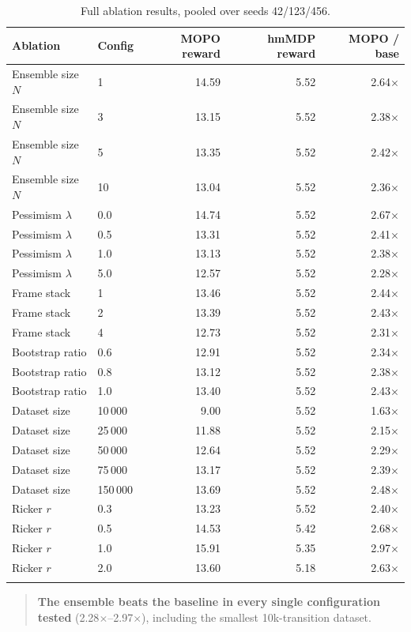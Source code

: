 \documentclass[11pt]{article}
\begin{document}
\begin{longtable}{llrrr}
\toprule
Ablation & Config & MOPO reward & hmMDP reward & MOPO / base \\
\midrule
\endhead
Ensemble size $N$ & 1   & 14.59 & 5.52 & 2.64$\times$ \\
Ensemble size $N$ & 3   & 13.15 & 5.52 & 2.38$\times$ \\
Ensemble size $N$ & 5   & 13.35 & 5.52 & 2.42$\times$ \\
Ensemble size $N$ & 10  & 13.04 & 5.52 & 2.36$\times$ \\
Pessimism $\lambda$ & 0.0 & 14.74 & 5.52 & 2.67$\times$ \\
Pessimism $\lambda$ & 0.5 & 13.31 & 5.52 & 2.41$\times$ \\
Pessimism $\lambda$ & 1.0 & 13.13 & 5.52 & 2.38$\times$ \\
Pessimism $\lambda$ & 5.0 & 12.57 & 5.52 & 2.28$\times$ \\
Frame stack & 1 & 13.46 & 5.52 & 2.44$\times$ \\
Frame stack & 2 & 13.39 & 5.52 & 2.43$\times$ \\
Frame stack & 4 & 12.73 & 5.52 & 2.31$\times$ \\
Bootstrap ratio & 0.6 & 12.91 & 5.52 & 2.34$\times$ \\
Bootstrap ratio & 0.8 & 13.12 & 5.52 & 2.38$\times$ \\
Bootstrap ratio & 1.0 & 13.40 & 5.52 & 2.43$\times$ \\
Dataset size & 10\,000  & 9.00  & 5.52 & 1.63$\times$ \\
Dataset size & 25\,000  & 11.88 & 5.52 & 2.15$\times$ \\
Dataset size & 50\,000  & 12.64 & 5.52 & 2.29$\times$ \\
Dataset size & 75\,000  & 13.17 & 5.52 & 2.39$\times$ \\
Dataset size & 150\,000 & 13.69 & 5.52 & 2.48$\times$ \\
Ricker $r$ & 0.3 & 13.23 & 5.52 & 2.40$\times$ \\
Ricker $r$ & 0.5 & 14.53 & 5.42 & 2.68$\times$ \\
Ricker $r$ & 1.0 & 15.91 & 5.35 & 2.97$\times$ \\
Ricker $r$ & 2.0 & 13.60 & 5.18 & 2.63$\times$ \\
\bottomrule
\caption{Full ablation results, pooled over seeds 42/123/456.}
\end{longtable}

\begin{quote}
\textbf{The ensemble beats the baseline in every single configuration
tested} (2.28$\times$--2.97$\times$), including the smallest
10k-transition dataset.
\end{quote}
\end{document}
